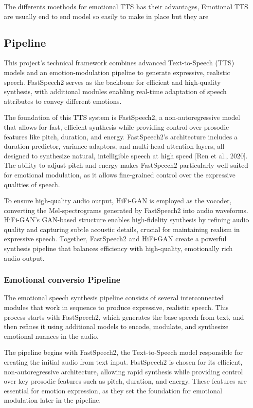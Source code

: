 The differents moethods for emotional TTS has their advantages, Emotional TTS are usually end to end model so easily to make in place but they are 

\subsection{Pipeline}

This project’s technical framework combines advanced Text-to-Speech (TTS) models and an emotion-modulation pipeline to generate expressive, realistic speech. FastSpeech2 serves as the backbone for efficient and high-quality synthesis, with additional modules enabling real-time adaptation of speech attributes to convey different emotions.


The foundation of this TTS system is FastSpeech2, a non-autoregressive model that allows for fast, efficient synthesis while providing control over prosodic features like pitch, duration, and energy. FastSpeech2’s architecture includes a duration predictor, variance adaptors, and multi-head attention layers, all designed to synthesize natural, intelligible speech at high speed [Ren et al., 2020]. The ability to adjust pitch and energy makes FastSpeech2 particularly well-suited for emotional modulation, as it allows fine-grained control over the expressive qualities of speech.

To ensure high-quality audio output, HiFi-GAN is employed as the vocoder, converting the Mel-spectrograms generated by FastSpeech2 into audio waveforms. HiFi-GAN’s GAN-based structure enables high-fidelity synthesis by refining audio quality and capturing subtle acoustic details, crucial for maintaining realism in expressive speech. Together, FastSpeech2 and HiFi-GAN create a powerful synthesis pipeline that balances efficiency with high-quality, emotionally rich audio output.

\subsubsection{Emotional conversio Pipeline}
The emotional speech synthesis pipeline consists of several interconnected modules that work in sequence to produce expressive, realistic speech. This process starts with FastSpeech2, which generates the base speech from text, and then refines it using additional models to encode, modulate, and synthesize emotional nuances in the audio.

The pipeline begins with FastSpeech2, the Text-to-Speech model responsible for creating the initial audio from text input. FastSpeech2 is chosen for its efficient, non-autoregressive architecture, allowing rapid synthesis while providing control over key prosodic features such as pitch, duration, and energy. These features are essential for emotion expression, as they set the foundation for emotional modulation later in the pipeline.

